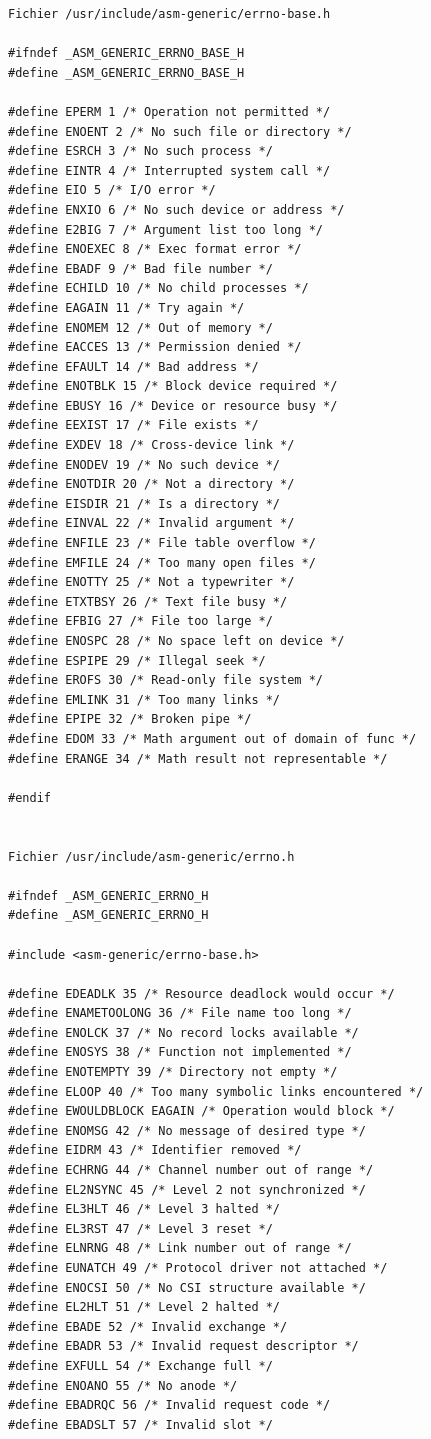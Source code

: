 \documentclass[french]{scrartcl}
\begin{document}
\clearpage
{}
\vspace{-5pt}\begin{lstlisting}[multicols=2]
Fichier /usr/include/asm-generic/errno-base.h

#ifndef _ASM_GENERIC_ERRNO_BASE_H 
#define _ASM_GENERIC_ERRNO_BASE_H  

#define EPERM 1 /* Operation not permitted */ 
#define ENOENT 2 /* No such file or directory */
#define ESRCH 3 /* No such process */ 
#define EINTR 4 /* Interrupted system call */ 
#define EIO 5 /* I/O error */ 
#define ENXIO 6 /* No such device or address */
#define E2BIG 7 /* Argument list too long */ 
#define ENOEXEC 8 /* Exec format error */ 
#define EBADF 9 /* Bad file number */ 
#define ECHILD 10 /* No child processes */ 
#define EAGAIN 11 /* Try again */ 
#define ENOMEM 12 /* Out of memory */ 
#define EACCES 13 /* Permission denied */ 
#define EFAULT 14 /* Bad address */ 
#define ENOTBLK 15 /* Block device required */ 
#define EBUSY 16 /* Device or resource busy */ 
#define EEXIST 17 /* File exists */ 
#define EXDEV 18 /* Cross-device link */ 
#define ENODEV 19 /* No such device */ 
#define ENOTDIR 20 /* Not a directory */ 
#define EISDIR 21 /* Is a directory */
#define EINVAL 22 /* Invalid argument */ 
#define ENFILE 23 /* File table overflow */ 
#define EMFILE 24 /* Too many open files */ 
#define ENOTTY 25 /* Not a typewriter */ 
#define ETXTBSY 26 /* Text file busy */ 
#define EFBIG 27 /* File too large */ 
#define ENOSPC 28 /* No space left on device */ 
#define ESPIPE 29 /* Illegal seek */ 
#define EROFS 30 /* Read-only file system */ 
#define EMLINK 31 /* Too many links */ 
#define EPIPE 32 /* Broken pipe */ 
#define EDOM 33 /* Math argument out of domain of func */ 
#define ERANGE 34 /* Math result not representable */ 

#endif 


Fichier /usr/include/asm-generic/errno.h

#ifndef _ASM_GENERIC_ERRNO_H 
#define _ASM_GENERIC_ERRNO_H  

#include <asm-generic/errno-base.h>  

#define EDEADLK 35 /* Resource deadlock would occur */ 
#define ENAMETOOLONG 36 /* File name too long */ 
#define ENOLCK 37 /* No record locks available */ 
#define ENOSYS 38 /* Function not implemented */ 
#define ENOTEMPTY 39 /* Directory not empty */ 
#define ELOOP 40 /* Too many symbolic links encountered */ 
#define EWOULDBLOCK EAGAIN /* Operation would block */ 
#define ENOMSG 42 /* No message of desired type */ 
#define EIDRM 43 /* Identifier removed */ 
#define ECHRNG 44 /* Channel number out of range */ 
#define EL2NSYNC 45 /* Level 2 not synchronized */ 
#define EL3HLT 46 /* Level 3 halted */ 
#define EL3RST 47 /* Level 3 reset */ 
#define ELNRNG 48 /* Link number out of range */ 
#define EUNATCH 49 /* Protocol driver not attached */ 
#define ENOCSI 50 /* No CSI structure available */ 
#define EL2HLT 51 /* Level 2 halted */ 
#define EBADE 52 /* Invalid exchange */ 
#define EBADR 53 /* Invalid request descriptor */ 
#define EXFULL 54 /* Exchange full */ 
#define ENOANO 55 /* No anode */ 
#define EBADRQC 56 /* Invalid request code */ 
#define EBADSLT 57 /* Invalid slot */  


\end{lstlisting}
\end{document}

